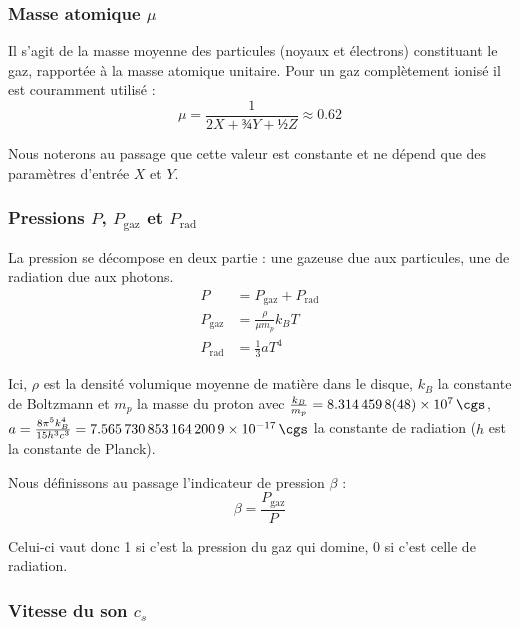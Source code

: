 \subsubsection{\texorpdfstring{Masse atomique $\mu$}{Masse atomique μ}}

Il s’agit de la masse moyenne des particules (noyaux et électrons) constituant
le gaz, rapportée à la masse atomique unitaire. Pour un gaz complètement ionisé
il est couramment utilisé :
\begin{equation}
    \label{eq:masse_atomique}
    \mu = \frac{\num{1}}{\num{2} X + ¾ Y + ½ Z} \approx \num{0.62}
\end{equation}

Nous noterons au passage que cette valeur est constante et ne dépend que des
paramètres d’entrée $X$ et $Y$.

\subsubsection{\texorpdfstring{Pressions $P$, $P_\mathrm{gaz}$ et $P_\mathrm{rad}$}{Pressions P, Pgaz et Prad}}

La pression se décompose en deux partie : une gazeuse due aux particules, une de radiation due aux photons.
\begin{align}
    \label{eq:pression}
    P &= P_{\mathrm{gaz}} + P_{\mathrm{rad}} \\
    P_{\mathrm{gaz}} &= \frac{\rho}{\mu m_p} k_B T \\
    P_{\mathrm{rad}} &= \frac{\num{1}}{\num{3}} a T^{\num{4}}
\end{align}

Ici, $\rho$ est la densité volumique moyenne de matière dans le disque, $k_B$
la constante de Boltzmann et $m_p$ la masse du proton avec $\frac{k_B}{m_p} =
\SI{8.3144598(48)d7}{\cgs}$, $a = \frac{\num{8} \pi^{\num{5}} k_B^{\num{4}}}{15 h^{\num{3}} c^{\num{3}}} =
\SI{7.5657308531642009e-17}{\cgs}$ la constante de radiation ($h$ est la
constante de Planck).

Nous définissons au passage l’indicateur de pression $\beta$ :
\begin{equation}
    \label{eq:beta}
    \beta = \frac{P_{\mathrm{gaz}}}{P}
\end{equation}

Celui-ci vaut donc 1 si c’est la pression du gaz qui domine, 0 si c’est celle de radiation.

\subsubsection{\texorpdfstring{Vitesse du son $c_s$}{Vitesse du son cs}}

